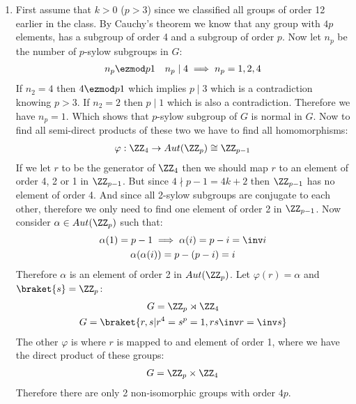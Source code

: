 \begin{enumerate}[label=]
    \item
        First assume that $k > 0$ ($p > 3$) since we classified all groups of order 12 earlier in the class. By Cauchy's theorem we know that any group with $4p$ elements, has a subgroup of order 4 and a subgroup of order $p$. Now let $n_p$ be the number of $p$-sylow subgroups in $G$:
        \begin{gather*}
            n_p \ezmod p 1 \ \ \ n_p \mid 4 \implies n_p = 1, 2, 4
        \end{gather*}
        If $n_2 = 4$ then $4 \ezmod p 1$ which implies $p \mid 3$ which is a contradiction knowing $p > 3$. If $n_2 = 2$ then $p \mid 1$ which is also a contradiction. Therefore we have $n_p = 1$. Which shows that $p$-sylow subgroup of $G$ is normal in $G$. Now to find all semi-direct products of these two we have to find all homomorphisms:
        \begin{gather*}
            \varphi: \ZZ_4 \to Aut(\ZZ_p) \cong \ZZ_{p - 1}
        \end{gather*}
        If we let $r$ to be the generator of $\ZZ_4$ then we should map $r$ to an element of order 4, 2 or 1 in $\ZZ_{p - 1}$. But since $4 \nmid p - 1 = 4k + 2$ then $\ZZ_{p - 1}$ has no element of order 4. And since all 2-sylow subgroups are conjugate to each other, therefore we only need to find one element of order 2 in $\ZZ_{p - 1}$. Now consider $\alpha \in Aut(\ZZ_p)$ such that:
        \begin{gather*}
            \alpha(1) = p - 1 \implies \alpha(i) = p - i = \inv i\\
            \alpha(\alpha(i)) = p - (p - i) = i
        \end{gather*}
        Therefore $\alpha$ is an element of order 2 in $Aut(\ZZ_p)$. Let $\varphi(r) = \alpha$ and $\braket{s} = \ZZ_p$:
        \begin{gather*}
            G = \ZZ_p \rtimes \ZZ_4 \\
            G = \braket{r, s| r^4 = s^p = 1, rs \inv r = \inv s}
        \end{gather*}
        The other $\varphi$ is where $r$ is mapped to and element of order 1, where we have the direct product of these groups:
        \begin{gather*}
            G = \ZZ_p \times \ZZ_4
        \end{gather*}
        Therefore there are only 2 non-isomorphic groups with order $4p$.
\end{enumerate}